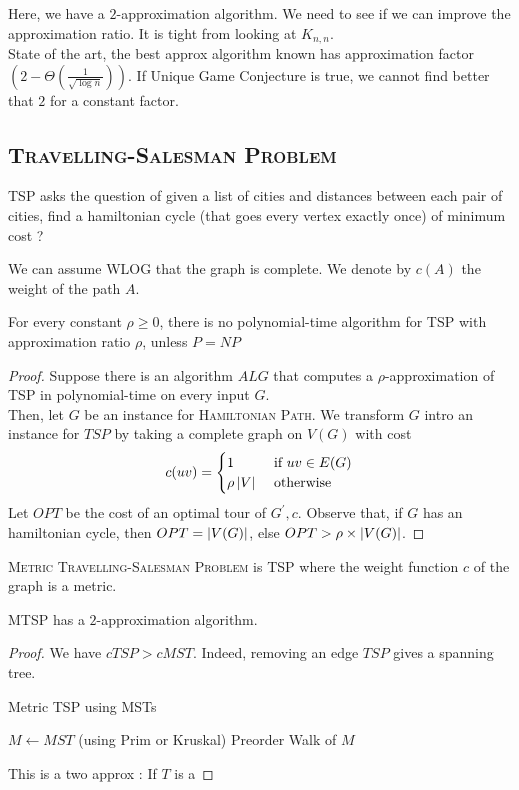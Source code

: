 \documentclass[12pt]{cours}
\begin{document}
Here, we have a $2$-approximation algorithm. We need to see if we can improve the approximation ratio. It is tight from looking at $K_{n, n}$. \\
State of the art, the best approx algorithm known has approximation factor $\left(2 - \Theta\left(\frac{1}{\sqrt{\log n}}\right)\right)$. If Unique Game Conjecture is true, we cannot find better that $2$ for a constant factor.

\subsection{\textsc{Travelling-Salesman Problem}}
\begin{definition}
    TSP asks the question of given a list of cities and distances between each pair of cities, find a hamiltonian cycle (that goes every vertex exactly once) of minimum cost ?
\end{definition}

We can assume WLOG that the graph is complete. We denote by $c(A)$ the weight of the path $A$. \\
\begin{theorem}
    For every constant $\rho \geq 0$, there is no polynomial-time algorithm for TSP with approximation ratio $\rho$, unless $P = NP$
\end{theorem}
\begin{proof}
    Suppose there is an algorithm $ALG$ that computes a $\rho$-approximation of TSP in polynomial-time on every input $G$.\\
    Then, let $G$ be an instance for \textsc{Hamiltonian Path}. We transform $G$ intro an instance for $TSP$ by taking a complete graph on $V(G)$ with cost \[c(uv) = \begin{cases}
        1 & \text{ if } uv\in E(G)\\
        \rho\left|V\right| &\text{ otherwise}
    \end{cases}\]
    Let $OPT$ be the cost of an optimal tour of $G^{'}, c$. Observe that, if $G$ has an hamiltonian cycle, then $OPT = \left|V(G)\right|$, else $OPT > \rho \times \left|V(G)\right|$.
\end{proof}

\begin{definition}
    \textsc{Metric Travelling-Salesman Problem} is \textsc{TSP} where the weight function $c$ of the graph is a metric.
\end{definition}

\begin{theorem}
    \textsc{MTSP} has a $2$-approximation algorithm.
\end{theorem}
\begin{proof}
    We have $c{TSP} > c{MST}$. Indeed, removing an edge $TSP$ gives a spanning tree.
    \begin{algorithm}
        \caption{Metric TSP using MSTs}
        \begin{algorithmic}
            \State $M \gets MST$ (using Prim or Kruskal)
            \State\Return Preorder Walk of $M$
        \end{algorithmic}
    \end{algorithm}
    This is a two approx : If $T$ is a
\end{proof}
\end{document}
